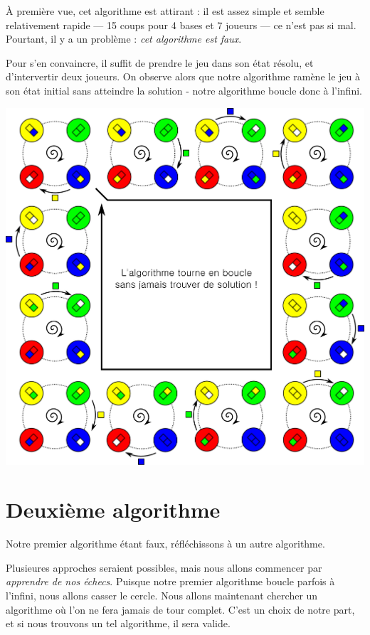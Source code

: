 À première vue, cet algorithme est attirant : il est assez simple et semble
relativement rapide --- 15 coups pour 4 bases et 7 joueurs --- ce n'est pas si
mal. Pourtant, il y a un problème : \textit{cet algorithme est faux}.

Pour s'en convaincre, il suffit de prendre le jeu dans son état résolu, et
d'intervertir deux joueurs. On observe alors que notre algorithme ramène le jeu
à son état initial sans atteindre la solution - notre algorithme boucle donc à
l'infini.

\begin{center}
  \includegraphics[width=\linewidth]{img/baseball_ex2.pdf}
\end{center}

\newpage

\section*{Deuxième algorithme}

Notre premier algorithme étant faux, réfléchissons à un autre
algorithme. 

Plusieures approches seraient possibles, mais nous allons commencer par
\textit{apprendre de nos échecs}. Puisque notre premier algorithme boucle parfois à
l'infini, nous allons casser le cercle. Nous allons maintenant chercher un
algorithme où l'on ne fera jamais de tour complet. C'est un choix de notre part,
et si nous trouvons un tel algorithme, il sera valide.


